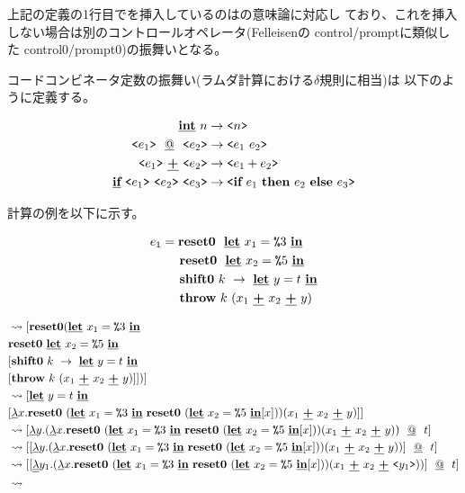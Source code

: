 上記の定義の1行目で\Resetz を挿入しているのは{\Shiftz}の意味論に対応し
ており、これを挿入しない場合は別のコントロールオペレータ(Felleisenの
control/promptに類似した control0/prompt0)の振舞いとなる。

コードコンビネータ定数の振舞い(ラムダ計算における$\delta$規則に相当)は
以下のように定義する。

\begin{align*}
  \underline{\textbf{int}}~ n &\to \texttt{<}{n}\texttt{>} \\
  \texttt{<}{e_1}\texttt{>}~ ~\underline{@}~~ \texttt{<}{e_2}\texttt{>} &\to \texttt{<}{e_1~ e_2}\texttt{>} \\
  \texttt{<}{e_1}\texttt{>}~ \underline{\textbf{+}}~ \texttt{<}{e_2}\texttt{>} &\to \texttt{<}{e_1 + e_2}\texttt{>} \\
  \underline{\textbf{if}}~\texttt{<}{{e_1}}\texttt{>}~\texttt{<}{{e_2}}\texttt{>}~\texttt{<}{{e_3}}\texttt{>} &\to \texttt{<}{\textbf{if}~{e_1}~\textbf{then}~{e_2}~\textbf{else}~{e_3}}\texttt{>} 
\end{align*}

計算の例を以下に示す。

\begin{align*}
  e_1 & = \textbf{reset0} ~~\underline{\textbf{let}}~x_1=\texttt{\%}{3}~\underline{\textbf{in}} \\
      & \phantom{=}~~ \textbf{reset0} ~~\underline{\textbf{let}}~x_2=\texttt{\%}{5}~\underline{\textbf{in}} \\
      & \phantom{=}~~ \textbf{shift0}~k~\to~\underline{\textbf{let}}~y=t~\underline{\textbf{in}} \\
      & \phantom{=}~~ \textbf{throw}~ k~ (x_1~\underline{\textbf{+}}~x_2~\underline{\textbf{+}}~y) \\
\end{align*}

\begin{align*}
  [ e_1 ] &\lto [ \Resetz (\cLet~x_1=\csp{3}~\cIn \\
          &\Resetz~ \cLet~x_2=\csp{5}~\cIn \\
          &[ \Shiftz~ k~ \to~ \cLet~ y=t~ \cIn \\
          &[ \Throw~ k~(x_1~\cPlus~x_2~\cPlus~y) ] ] ) ] \\
          &\lto [ \cLet~ y=t~ \cIn \\
          &[ \cfun{x}{\Resetz~ (\cLet~x_1=\csp{3}~ \cIn~ \Resetz~ (\cLet~ x_2=\csp{5}~ \cIn [x]))} (x_1~\cPlus~x_2~\cPlus~y) ]] \\
          &\lto [ \cfun{y}{(\cfun{x}{\Resetz~ (\cLet~x_1=\csp{3}~ \cIn~ \Resetz~ (\cLet~ x_2=\csp{5}~ \cIn [x]))} (x_1~\cPlus~x_2~\cPlus~y))}~ \cat~ t ] \\
          &\lto [[\cfun{y}{(\cfun{x}{\Resetz~ (\cLet~x_1=\csp{3}~ \cIn~ \Resetz~ (\cLet~ x_2=\csp{5}~ \cIn [x]))} (x_1~\cPlus~x_2~\cPlus~y))}]~ \cat~ t] \\
          &\lto [[\ccfun{y_1}{(\cfun{x}{\Resetz~ (\cLet~x_1=\csp{3}~ \cIn~ \Resetz~ (\cLet~ x_2=\csp{5}~ \cIn [x]))} (x_1~\cPlus~x_2~\cPlus~ \code{y_1}))}]~ \cat~ t] \\
          &\lto
\end{align*}

